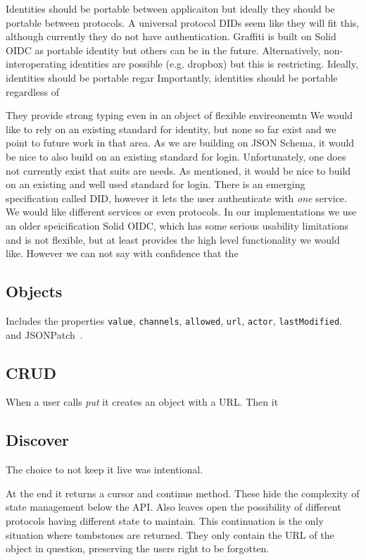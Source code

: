 Identities should be portable between applicaiton but ideally they
should be portable between protocols. A universal protocol DIDs
seem like they will fit this, although currently they do not have authentication.
Graffiti is built on Solid OIDC as portable identity but others can be in the future.
Alternatively, non-interoperating identities are possible (e.g. dropbox) but this is restricting.
Ideally, identities should be portable regar
Importantly, identities should be portable regardless of

They provide strong typing even in an object of flexible envireonemtn
We would like to rely on an existing standard for identity,
but none so far exist and we point to future work in that
area.
As we are building on JSON Schema, it would be nice to also build on
an existing standard for login. Unfortunately, one does not currently
exist that suits are needs.
As mentioned, it would be nice to build on an existing and
well used standard for login. There is an emerging specification
called DID, however it lets the user authenticate with \emph{one}
service. We would like different services or even protocols.
In our implementations we use an older speicification Solid OIDC,
which has some serious usability limitations and is not flexible,
but at least provides the high level functionality we would like.
However we can not say with confidence that the

\subsection{Objects}

Includes the properties
\texttt{value}, \texttt{channels}, \texttt{allowed},
\texttt{url}, \texttt{actor}, \texttt{lastModified}.
and JSONPatch~\cite{jsonpatch}.

\subsection{CRUD}

When a user calls \emph{put} it creates an object with a URL.
Then it

\subsection{Discover}

The choice to not keep it live was intentional.

At the end it returns a cursor and continue method.
These hide the complexity of state management below the API.
Also leaves open the possibility of different protocols having different state to maintain.
This continuation is the only situation where tombstones are returned.
They only contain the URL of the object in question, preserving the users right to be forgotten.

